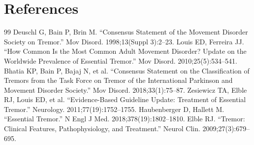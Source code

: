 \section*{References}
\begin{thebibliography}{99}
 Deuschl G, Bain P, Brin M. ``Consensus Statement of the Movement Disorder Society on Tremor.'' Mov Disord. 1998;13(Suppl 3):2--23.
 Louis ED, Ferreira JJ. ``How Common Is the Most Common Adult Movement Disorder? Update on the Worldwide Prevalence of Essential Tremor.'' Mov Disord. 2010;25(5):534--541.
 Bhatia KP, Bain P, Bajaj N, et al. ``Consensus Statement on the Classification of Tremors from the Task Force on Tremor of the International Parkinson and Movement Disorder Society.'' Mov Disord. 2018;33(1):75--87.
 Zesiewicz TA, Elble RJ, Louis ED, et al. ``Evidence-Based Guideline Update: Treatment of Essential Tremor.'' Neurology. 2011;77(19):1752--1755.
 Haubenberger D, Hallett M. ``Essential Tremor.'' N Engl J Med. 2018;378(19):1802--1810.
 Elble RJ. ``Tremor: Clinical Features, Pathophysiology, and Treatment.'' Neurol Clin. 2009;27(3):679--695.
\end{thebibliography}

